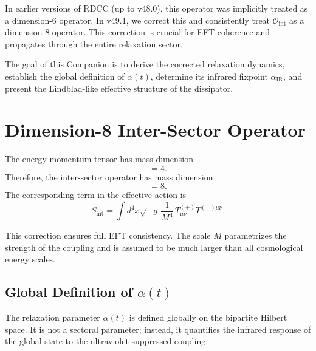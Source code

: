 \documentclass[11pt,a4paper]{article}
\begin{document}
In earlier versions of RDCC (up to v48.0), this operator was implicitly treated
as a dimension-6 operator. In v49.1, we correct this and consistently treat
$\mathcal{O}_{\mathrm{int}}$ as a dimension-8 operator. This correction is
crucial for EFT coherence and propagates through the entire relaxation sector.

The goal of this Companion is to derive the corrected relaxation dynamics,
establish the global definition of $\alpha(t)$, determine its infrared fixpoint
$\alpha_{\mathrm{IR}}$, and present the Lindblad-like effective structure of
the dissipator.

\section{Dimension-8 Inter-Sector Operator}

The energy-momentum tensor has mass dimension
\begin{equation}
[T_{\mu\nu}] = 4.
\end{equation}
Therefore, the inter-sector operator has mass dimension
\begin{equation}
[T^{(+)}_{\mu\nu} T^{(-)\mu\nu}] = 8.
\end{equation}
The corresponding term in the effective action is
\begin{equation}
S_{\mathrm{int}}
=
\int d^4x \sqrt{-g} \,
\frac{1}{M^4} \,
T^{(+)}_{\mu\nu} T^{(-)\mu\nu}.
\label{eq:dim8action}
\end{equation}

This correction ensures full EFT consistency. The scale $M$ parametrizes the
strength of the coupling and is assumed to be much larger than all cosmological
energy scales.

\subsection[Global Definition of alpha(t)]{Global Definition of $\alpha(t)$}

The relaxation parameter $\alpha(t)$ is defined globally on the bipartite
Hilbert space. It is not a sectoral parameter; instead, it quantifies the
infrared response of the global state to the ultraviolet-suppressed coupling.
\end{document}
